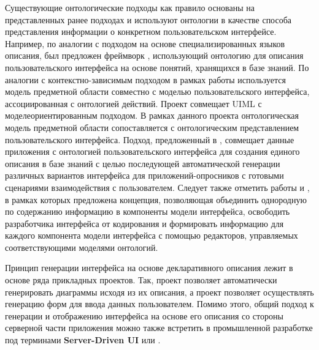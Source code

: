 \begin{SCn}
\begin{itemize}
Существующие онтологические подходы как правило основаны на представленных ранее подходах и используют онтологии в качестве способа представления информации о конкретном пользовательском интерфейсе. Например, по аналогии с подходом на основе специализированных языков описания, был предложен фреймворк , использующий онтологию для описания пользовательского интерфейса на основе понятий, хранящихся в базе знаний. По аналогии с контекстно-зависимым подходом в рамках работы  используется модель предметной области совместно с моделью пользовательского интерфейса, ассоциированная с онтологией действий. Проект  совмещает UIML с моделеориентированным подходом. В рамках данного проекта онтологическая модель предметной области сопоставляется с онтологическим представлением пользовательского интерфейса. Подход, предложенный в , совмещает данные приложения с онтологией пользовательского интерфейса для создания единого описания в базе знаний с целью последующей автоматической генерации различных вариантов интерфейса для приложений-опросников с готовыми сценариями взаимодействия с пользователем. Следует также отметить работы  и , в рамках которых предложена концепция, позволяющая объединить однородную по содержанию информацию в компоненты модели интерфейса, освободить разработчика интерфейса от кодирования и формировать информацию для каждого компонента модели интерфейса с помощью редакторов, управляемых соответствующими моделями онтологий.

Принцип генерации интерфейса на основе декларативного описания лежит в основе ряда прикладных проектов. Так, проект  позволяет автоматически генерировать диаграммы исходя из их описания, а проект  позволяет осуществлять генерацию форм для ввода данных пользователем. Помимо этого, общий подход к генерации и отображению интерфейса на основе его описания со стороны серверной части приложения можно также встретить в промышленной разработке под терминами \textbf{Server-Driven UI} или .
	
	
	
\end{itemize}


\end{SCn}
